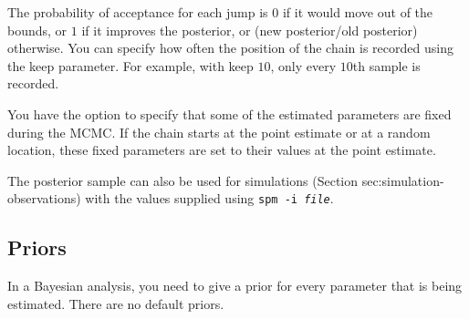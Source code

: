 


The probability of acceptance for each jump is $0$ if it would move out of the bounds, or $1$ if it improves the posterior, or (new posterior/old posterior) otherwise. You can specify how often the position of the chain is recorded using the keep parameter. For example, with keep $10$, only every $10$th sample is recorded. 

You have the option to specify that some of the estimated parameters are fixed during the MCMC. If the chain starts at the point estimate or at a random location, these fixed parameters are set to their values at the point estimate. %

The posterior sample can also be used for %
simulations (Section {sec:simulation-observations}) with the values supplied using \texttt{spm -i \emph{file}}.

\subsection{Priors\label{sec:priors}}

In a Bayesian analysis, you need to give a prior for every parameter that is being estimated. There are no default priors.  

